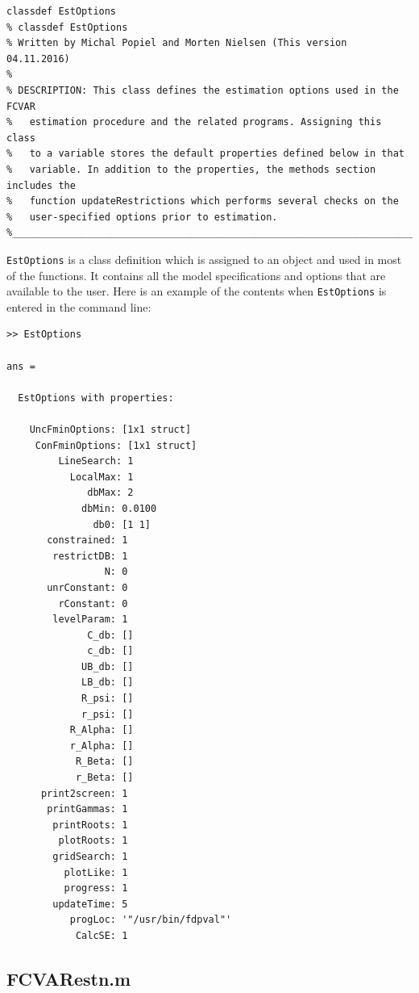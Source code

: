 \documentclass[10pt]{article}
\begin{document}
\begin{lstlisting}[frame=single,caption={EstOptions.m}, label = EstOpt]
classdef EstOptions  
% classdef EstOptions 
% Written by Michal Popiel and Morten Nielsen (This version 04.11.2016)
% 
% DESCRIPTION: This class defines the estimation options used in the FCVAR
% 	estimation procedure and the related programs. Assigning this class
% 	to a variable stores the default properties defined below in that
% 	variable. In addition to the properties, the methods section includes the
% 	function updateRestrictions which performs several checks on the
% 	user-specified options prior to estimation.
%_________________________________________________________________________
\end{lstlisting}

\verb|EstOptions| is a class definition which is assigned to an object and used in most of the functions. It contains all the model specifications and options that are available to the user. Here is an example of the contents when \verb|EstOptions| is entered in the command line:

\begin{verbatim}
>> EstOptions

ans = 

  EstOptions with properties:

    UncFminOptions: [1x1 struct]
     ConFminOptions: [1x1 struct]
         LineSearch: 1
           LocalMax: 1
              dbMax: 2
             dbMin: 0.0100
               db0: [1 1]
       constrained: 1
        restrictDB: 1
                 N: 0
       unrConstant: 0
         rConstant: 0
        levelParam: 1
              C_db: []
              c_db: []
             UB_db: []
             LB_db: []
             R_psi: []
             r_psi: []
           R_Alpha: []
           r_Alpha: []
            R_Beta: []
            r_Beta: []
      print2screen: 1
       printGammas: 1
        printRoots: 1
         plotRoots: 1
        gridSearch: 1
          plotLike: 1
          progress: 1
        updateTime: 5
           progLoc: '"/usr/bin/fdpval"'
            CalcSE: 1
\end{verbatim}

\subsection{FCVARestn.m}
\label{subsec fcvarestn}
\end{document}
